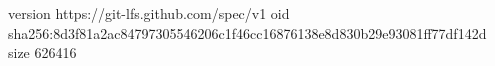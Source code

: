 version https://git-lfs.github.com/spec/v1
oid sha256:8d3f81a2ac84797305546206c1f46cc16876138e8d830b29e93081ff77df142d
size 626416
